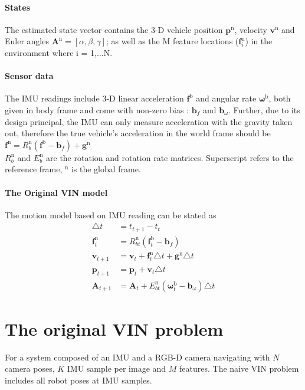 \documentclass[12pt]{article}   %
\begin{document}
\paragraph{States}
The estimated state vector contains the 3-D vehicle position $\bm{p}^{\mathrm{n}}$, velocity $\bm{v}^{\mathrm{n}}$ and Euler angles $\bm{A}^{\mathrm{n}}=[\alpha,\beta,\gamma]$; as well as the M feature locations ($\bm{f}_i^{\mathrm{n}}$) in the environment where i = 1,...N. 
\paragraph{Sensor data}
The IMU readings include 3-D linear acceleration $\bm{f}^{\mathrm{b}}$ and angular rate $\bm{\omega}^{\mathrm{b}}$, both given in body frame and come with non-zero bias : $\bm{b}_f$ and $\bm{b}_\omega$. \newline
Further, due to its design principal, the IMU can only measure acceleration with the gravity taken out, therefore the true vehicle's acceleration in the world frame should be \\
$\bm{f}^{\mathrm{n}} = R_b^{\mathrm{n}}( \bm{f}^{\mathrm{b}}-\bm{b}_f ) + \bm{g}^{\mathrm{n}}$ \\
$R_b^{\mathrm{n}}$ and $E_b^{\mathrm{n}}$ are the rotation and rotation rate matrices.
Superscript refers to the reference frame, ${}^{\mathrm{n}}$ is the global frame.

\paragraph{The Original VIN model}
The motion model based on IMU reading can be stated as
\begin{align*}
	\triangle t & =  t_{t+1} - t_t \\
	\bm{f}_t^{\mathrm{n}} & = R_{bt}^{\mathrm{n}}  (\bm{f}_t^{\mathrm{b}} - \bm{b}_f) \\
	\bm{v}_{t+1} & = \bm{v}_{t} + \bm{f}_t^{\mathrm{n}} \triangle t + \bm{g}^{\mathrm{n}} \triangle t \\
	\bm{p}_{t+1} & = \bm{p}_{t} + \bm{v}_t \triangle t \\
	\bm{A}_{t+1} & = \bm{A}_t + E_{bt}^{\mathrm{n}}  (\bm{\omega}_t^{\mathrm{b}} - \bm{b}_\omega) \triangle t
\end{align*}

\section{The original VIN problem}
For a system composed of an IMU and a RGB-D camera navigating with $N$ camera poses, $K$ IMU sample per image and $M$ features. The naive VIN problem includes all robot poses at IMU samples.
\end{document}
